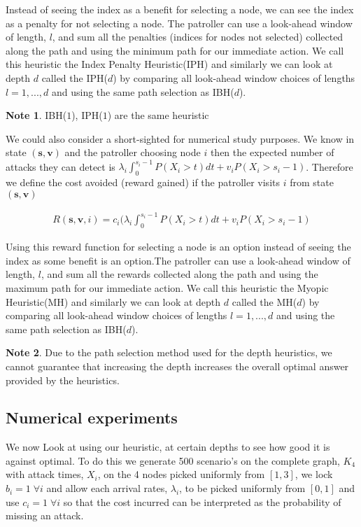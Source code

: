 \documentclass[a4paper,10pt]{article}
\theoremstyle{definition}
\theoremstyle{definition}
\theoremstyle{remark}
\theoremstyle{definition}
\newtheorem*{note}{Note}
\begin{document}
Instead of seeing the index as a benefit for selecting a node, we can see the index as a penalty for not selecting a node. The patroller can use a look-ahead window of length, $l$, and sum all the penalties (indices for nodes not selected) collected along the path and using the minimum path for our immediate action. We call this heuristic the Index Penalty Heuristic(IPH) and similarly we can look at depth $d$ called the IPH($d$) by comparing all look-ahead window choices of lengths $l=1,...,d$ and using the same path selection as IBH($d$).

\begin{note}
IBH($1$), IPH($1$) are the same heuristic
\end{note}

We could also consider a short-sighted for numerical study purposes. We know in state $(\bm{s},\bm{v})$ and the patroller choosing node $i$ then the expected number of attacks they can detect is $\lambda_{i} \int_{0}^{s_{i}-1} P(X_{i} > t ) dt + v_{i} P(X_{i} > s_{i}-1)$. Therefore we define the cost avoided (reward gained) if the patroller visits $i$ from state $(\bm{s},\bm{v})$

\begin{align*}
R(\bm{s},\bm{v},i)= c_{i} ( \lambda_{i} \int_{0}^{s_{i}-1} P(X_{i} > t ) dt + v_{i} P(X_{i} > s_{i}-1)
\end{align*}

Using this reward function for selecting a node is an option instead of seeing the index as some benefit is an option.The patroller can use a look-ahead window of length, $l$, and sum all the rewards collected along the path and using the maximum path for our immediate action. We call this heuristic the Myopic Heuristic(MH) and similarly we can look at depth $d$ called the MH($d$) by comparing all look-ahead window choices of lengths $l=1,...,d$ and using the same path selection as IBH($d$).

\begin{note}
Due to the path selection method used for the depth heuristics, we cannot guarantee that increasing the depth increases the overall optimal answer provided by the heuristics.
\end{note}

\subsection{Numerical experiments}
We now Look at using our heuristic, at certain depths to see how good it is against optimal. To do this we generate 500 scenario's on the complete graph, $K_{4}$ with attack times, $X_{i}$, on the 4 nodes picked uniformly from $[1,3]$, we lock $b_{i}=1 \; \forall i$ and allow each arrival rates, $\lambda_{i}$, to be picked uniformly from $[0,1]$ and use $c_{i}=1 \; \forall i$ so that the cost incurred can be interpreted as the probability of missing an attack.
\end{document}
